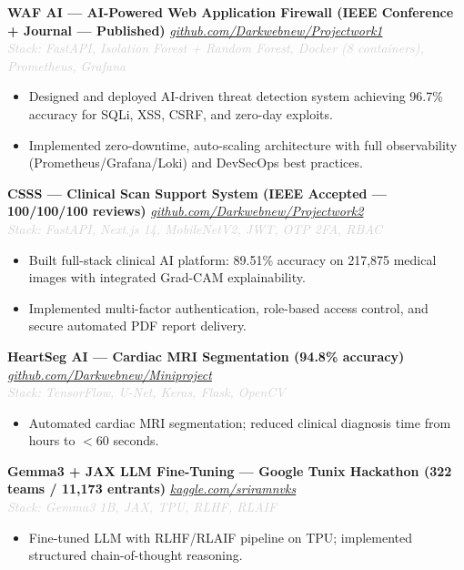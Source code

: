\documentclass[9.5pt, letterpaper]{article}
\newcommand{\proj}[3]{%
  \textbf{#1} \hfill \textcolor{lightgray}{\small\textit{#2}}\\[-2pt]
  {\footnotesize\textit{\textcolor{lightgray}{Stack: #3}}}}
\begin{document}
\proj{WAF AI --- AI-Powered Web Application Firewall \textbf{(IEEE Conference + Journal --- Published)}}{\href{https://github.com/Darkwebnew/Projectwork1}{github.com/Darkwebnew/Projectwork1}}{FastAPI, Isolation Forest + Random Forest, Docker (8 containers), Prometheus, Grafana}
\begin{itemize}
  \item Designed and deployed AI-driven threat detection system achieving 96.7\% accuracy for SQLi, XSS, CSRF, and zero-day exploits.
  \item Implemented zero-downtime, auto-scaling architecture with full observability (Prometheus/Grafana/Loki) and DevSecOps best practices.
\end{itemize}
\vspace{4pt}

\proj{CSSS --- Clinical Scan Support System \textbf{(IEEE Accepted --- 100/100/100 reviews)}}{\href{https://github.com/Darkwebnew/Projectwork2}{github.com/Darkwebnew/Projectwork2}}{FastAPI, Next.js 14, MobileNetV2, JWT, OTP 2FA, RBAC}
\begin{itemize}
  \item Built full-stack clinical AI platform: 89.51\% accuracy on 217,875 medical images with integrated Grad-CAM explainability.
  \item Implemented multi-factor authentication, role-based access control, and secure automated PDF report delivery.
\end{itemize}
\vspace{4pt}

\proj{HeartSeg AI --- Cardiac MRI Segmentation \textbf{(94.8\% accuracy)}}{\href{https://github.com/Darkwebnew/Miniproject}{github.com/Darkwebnew/Miniproject}}{TensorFlow, U-Net, Keras, Flask, OpenCV}
\begin{itemize}
  \item Automated cardiac MRI segmentation; reduced clinical diagnosis time from hours to $<$60 seconds.
\end{itemize}
\vspace{4pt}

\proj{Gemma3 + JAX LLM Fine-Tuning --- Google Tunix Hackathon (322 teams / 11,173 entrants)}{\href{https://www.kaggle.com/code/sriramnvks/gemma3-1b-model-in-tunix}{kaggle.com/sriramnvks}}{Gemma3 1B, JAX, TPU, RLHF, RLAIF}
\begin{itemize}
  \item Fine-tuned LLM with RLHF/RLAIF pipeline on TPU; implemented structured chain-of-thought reasoning.
\end{itemize}
\end{document}
